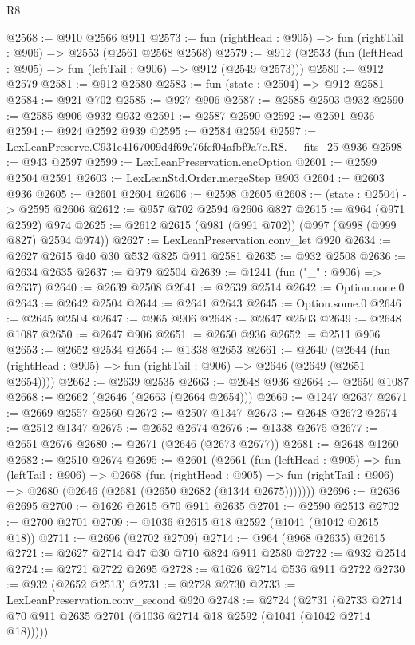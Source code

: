 \begin{lexlean}{R8}
\begin{coremodule}
@2568 := @910 @2566 @911
@2573 := fun (rightHead : @905) => fun (rightTail : @906) => @2553 (@2561 @2568 @2568)
@2579 := @912 (@2533 (fun (leftHead : @905) => fun (leftTail : @906) => @912 (@2549 @2573)))
@2580 := @912 @2579
@2581 := @912 @2580
@2583 := fun (state : @2504) => @912 @2581
@2584 := @921 @702
@2585 := @927 @906
@2587 := @2585 @2503 @932
@2590 := @2585 @906 @932 @932
@2591 := @2587 @2590
@2592 := @2591 @936
@2594 := @924 @2592 @939
@2595 := @2584 @2594
@2597 := LexLeanPreserve.C931e4167009d4f69c76fcf04afbf9a7e.R8.__fits_25 @936
@2598 := @943 @2597
@2599 := LexLeanPreservation.encOption
@2601 := @2599 @2504 @2591
@2603 := LexLeanStd.Order.mergeStep @903
@2604 := @2603 @936
@2605 := @2601 @2604
@2606 := @2598 @2605
@2608 := (state : @2504) -> @2595 @2606
@2612 := @957 @702 @2594 @2606 @827
@2615 := @964 (@971 @2592) @974
@2625 := @2612 @2615 (@981 (@991 @702)) (@997 (@998 (@999 @827) @2594 @974))
@2627 := LexLeanPreservation.conv_let @920
@2634 := @2627 @2615 @40 @30 @532 @825 @911 @2581
@2635 := @932 @2508
@2636 := @2634 @2635
@2637 := @979 @2504
@2639 := @1241 (fun ("_" : @906) => @2637)
@2640 := @2639 @2508
@2641 := @2639 @2514
@2642 := Option.none.{0}
@2643 := @2642 @2504
@2644 := @2641 @2643
@2645 := Option.some.{0}
@2646 := @2645 @2504
@2647 := @965 @906
@2648 := @2647 @2503
@2649 := @2648 @1087
@2650 := @2647 @906
@2651 := @2650 @936
@2652 := @2511 @906
@2653 := @2652 @2534
@2654 := @1338 @2653
@2661 := @2640
    (@2644 (fun (rightHead : @905) => fun (rightTail : @906) => @2646 (@2649 (@2651 @2654))))
@2662 := @2639 @2535
@2663 := @2648 @936
@2664 := @2650 @1087
@2668 := @2662 (@2646 (@2663 (@2664 @2654)))
@2669 := @1247 @2637
@2671 := @2669 @2557 @2560
@2672 := @2507 @1347
@2673 := @2648 @2672
@2674 := @2512 @1347
@2675 := @2652 @2674
@2676 := @1338 @2675
@2677 := @2651 @2676
@2680 := @2671 (@2646 (@2673 @2677))
@2681 := @2648 @1260
@2682 := @2510 @2674
@2695 := @2601
    (@2661
      (fun (leftHead : @905) =>
      fun (leftTail : @906) =>
      @2668
        (fun (rightHead : @905) =>
        fun (rightTail : @906) => @2680 (@2646 (@2681 (@2650 @2682 (@1344 @2675)))))))
@2696 := @2636 @2695
@2700 := @1626 @2615 @70 @911 @2635
@2701 := @2590 @2513
@2702 := @2700 @2701
@2709 := @1036 @2615 @18 @2592 (@1041 (@1042 @2615 @18))
@2711 := @2696 (@2702 @2709)
@2714 := @964 (@968 @2635) @2615
@2721 := @2627 @2714 @47 @30 @710 @824 @911 @2580
@2722 := @932 @2514
@2724 := @2721 @2722 @2695
@2728 := @1626 @2714 @536 @911 @2722
@2730 := @932 (@2652 @2513)
@2731 := @2728 @2730
@2733 := LexLeanPreservation.conv_second @920
@2748 := @2724
    (@2731 (@2733 @2714 @70 @911 @2635 @2701 (@1036 @2714 @18 @2592 (@1041 (@1042 @2714 @18)))))

\end{coremodule}
\end{lexlean}
